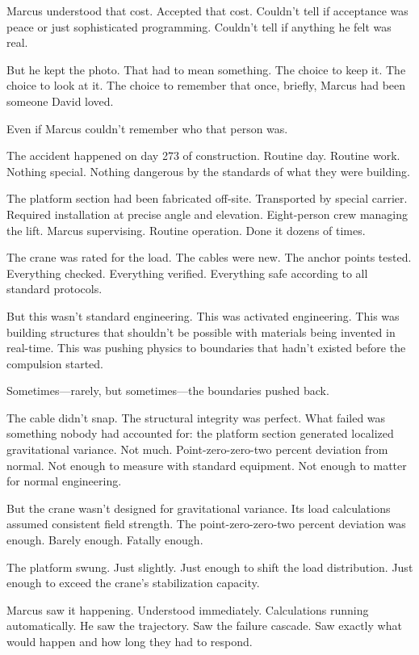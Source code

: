Marcus understood that cost. Accepted that cost. Couldn't tell if acceptance was peace or just sophisticated programming. Couldn't tell if anything he felt was real.

But he kept the photo. That had to mean something. The choice to keep it. The choice to look at it. The choice to remember that once, briefly, Marcus had been someone David loved.

Even if Marcus couldn't remember who that person was.

\scenebreak

The accident happened on day 273 of construction. Routine day. Routine work. Nothing special. Nothing dangerous by the standards of what they were building.

The platform section had been fabricated off-site. Transported by special carrier. Required installation at precise angle and elevation. Eight-person crew managing the lift. Marcus supervising. Routine operation. Done it dozens of times.

The crane was rated for the load. The cables were new. The anchor points tested. Everything checked. Everything verified. Everything safe according to all standard protocols.

But this wasn't standard engineering. This was activated engineering. This was building structures that shouldn't be possible with materials being invented in real-time. This was pushing physics to boundaries that hadn't existed before the compulsion started.

Sometimes—rarely, but sometimes—the boundaries pushed back.

The cable didn't snap. The structural integrity was perfect. What failed was something nobody had accounted for: the platform section generated localized gravitational variance. Not much. Point-zero-zero-two percent deviation from normal. Not enough to measure with standard equipment. Not enough to matter for normal engineering.

But the crane wasn't designed for gravitational variance. Its load calculations assumed consistent field strength. The point-zero-zero-two percent deviation was enough. Barely enough. Fatally enough.

The platform swung. Just slightly. Just enough to shift the load distribution. Just enough to exceed the crane's stabilization capacity.

Marcus saw it happening. Understood immediately. Calculations running automatically. He saw the trajectory. Saw the failure cascade. Saw exactly what would happen and how long they had to respond.


